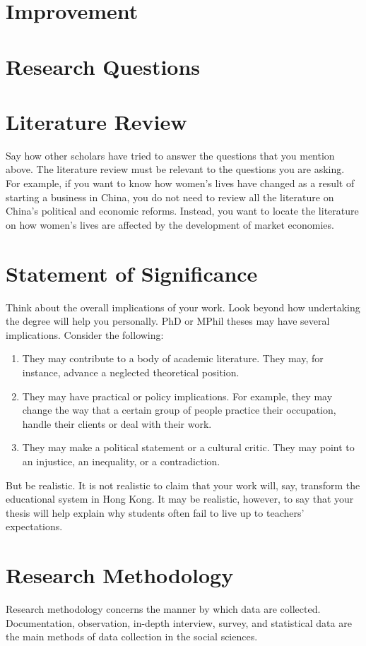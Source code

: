 \documentclass[draftclsnofoot,journal,onecolumn,12pt]{IEEEtran}
\begin{document}
\section{Improvement}

\section{Research Questions}

\section{Literature Review}
Say how other scholars have tried to answer the questions that you mention above. The literature review must be
relevant to the questions you are asking. For example, if you want to know how women's lives have changed as
a result of starting a business in China, you do not need to review all the literature on China's political and
economic reforms. Instead, you want to locate the literature on how women's lives are affected by the
development of market economies.

\section{Statement of Significance}
Think about the overall implications of your work. Look beyond how undertaking the degree will help you
personally. PhD or MPhil theses may have several implications. Consider the following:
\begin{enumerate}
  \item They may contribute to a body of academic literature. They may, for instance, advance a neglected theoretical
position.
  \item They may have practical or policy implications. For example, they may change the way that a certain group
of people practice their occupation, handle their clients or deal with their work.
  \item They may make a political statement or a cultural critic. They may point to an injustice, an inequality, or a
contradiction.
\end{enumerate}

But be realistic. It is not realistic to claim that your work will, say, transform the educational system in Hong
Kong. It may be realistic, however, to say that your thesis will help explain why students often fail to live up to
teachers' expectations.

\section{Research Methodology}
Research methodology concerns the manner by which data are collected. Documentation, observation, in-depth
interview, survey, and statistical data are the main methods of data collection in the social sciences.
\end{document}
